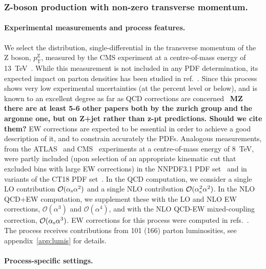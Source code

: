 \subsubsection{Z-boson production with non-zero transverse momentum.}

\paragraph{Experimental measurements and process features.}
We select the distribution, single-differential in the transverse momentum of
the Z boson, $p_\mathrm{T}^\mathrm{Z}$, measured by the CMS experiment at a centre-of-mass
energy of \SI{13}{\tera\electronvolt}~\cite{Sirunyan:2019bzr}. While this measurement is not
included in any PDF determination, its expected impact on parton densities has been studied in 
ref.~\cite{Boughezal:2017nla}. Since this process shows very low experimental uncertainties (at the percent level or below), and is
known to an excellent degree as far as QCD corrections are concerned~\cite{Gehrmann-DeRidder:2017mvr,Bizon:2019zgf} {\bf MZ there are at least 5-6 other papers both
by the zurich group and the argonne one, but on Z+jet rather than z-pt predictions. Should we cite them?}
EW corrections are expected to be essential in order to achieve a good
description of it, and to constrain accurately the PDFs. Analogous measurements,
from the ATLAS~\cite{Aad:2015auj} and CMS~\cite{Khachatryan:2015oaa}
experiments at a centre-of-mass energy of \SI{8}{\tera\electronvolt}, were partly included (upon
selection of an appropriate kinematic cut that excluded bins with large EW
corrections) in the NNPDF3.1 PDF set~\cite{Ball:2017nwa} and in variants of
the CT18 PDF set~\cite{Hou:2019efy}. In the QCD computation, we consider a
single LO contribution $\mathcal{O}(\alpha_\mathrm{s}\alpha^2)$ and a single NLO
contribution $\mathcal{O}(\alpha_\mathrm{s}^2\alpha^2)$. In the NLO QCD+EW computation,
we supplement these with the LO and NLO EW corrections,
$\mathcal{O}(\alpha^3)$ and $\mathcal{O}(\alpha^4)$, and with the NLO
QCD-EW mixed-coupling correction, $\mathcal{O}(\alpha_\mathrm{s}\alpha^3)$. EW corrections for
this process were computed in
refs.~\cite{Kuhn:2005az,Denner:2011vu,Hollik:2015pja,Kallweit:2015dum}.
The process receives contributions from 101 (166) parton luminosities,
see appendix~\ref{app:lumis} for details.

\paragraph{Process-specific settings.}

